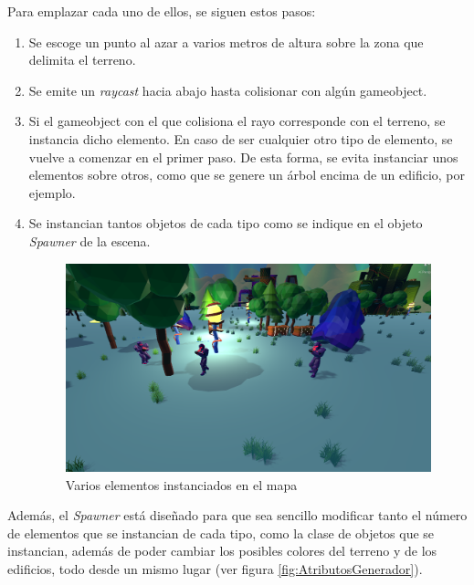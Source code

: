\begin{enumerate}
    Para emplazar cada uno de ellos, se siguen estos pasos:
    \begin{enumerate}
    \item Se escoge un punto al azar a varios metros de altura sobre la zona que delimita el terreno.
    \item Se emite un \textit{raycast} hacia abajo hasta colisionar con algún gameobject.
    \item Si el gameobject con el que colisiona el rayo corresponde con el terreno, se instancia dicho elemento. En caso de ser cualquier otro tipo de elemento, se vuelve a comenzar en el primer paso. De esta forma, se evita instanciar unos elementos sobre otros, como que se genere un árbol encima de un edificio, por ejemplo.
    \item Se instancian tantos objetos de cada tipo como se indique en el objeto \textit{Spawner} de la escena.
    \begin{figure}[h]
	\centering
	\includegraphics[scale=0.45]{img/ElementsGenerator.png}
	\caption{Varios elementos instanciados en el mapa}
	\label{fig:GeneracionElementos}
    \end{figure}
    \end{enumerate}
    
    Además, el \textit{Spawner} está diseñado para que sea sencillo modificar tanto el número de elementos que se instancian de cada tipo, como la clase de objetos que se instancian, además de poder cambiar los posibles colores del terreno y de los edificios, todo desde un mismo lugar (ver figura \ref{fig:AtributosGenerador}).


\end{enumerate}
